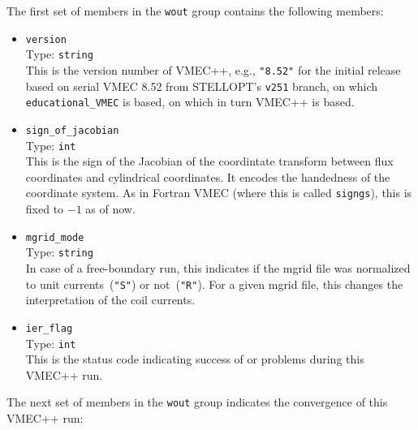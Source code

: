 The first set of members in the \texttt{wout} group
contains the following members:
\begin{itemize}
 \item \texttt{version} \\
       Type: \texttt{string} \\
       This is the version number of VMEC++, e.g.,
       \texttt{"8.52"} for the initial release based on serial VMEC 8.52 from STELLOPT's \texttt{v251} branch,
       on which \texttt{educational\_VMEC} is based, on which in turn VMEC++ is based.
 \item \texttt{sign\_of\_jacobian} \\
       Type: \texttt{int} \\
       This is the sign of the Jacobian of the coordintate transform between flux coordinates
       and cylindrical coordinates. It encodes the handedness of the coordinate system.
       As in Fortran VMEC (where this is called \texttt{signgs}), this is fixed to $-1$ as of now.
 \item \texttt{mgrid\_mode} \\
       Type: \texttt{string} \\
       In case of a free-boundary run,
       this indicates if the mgrid file was normalized to unit currents~(\texttt{"S"}) or not~(\texttt{"R"}).
       For a given mgrid file, this changes the interpretation of the coil currents.
 \item \texttt{ier\_flag} \\
       Type: \texttt{int} \\
       This is the status code indicating success of or problems during this VMEC++ run.
\end{itemize}
%
The next set of members in the \texttt{wout} group
indicates the convergence of this VMEC++ run:
